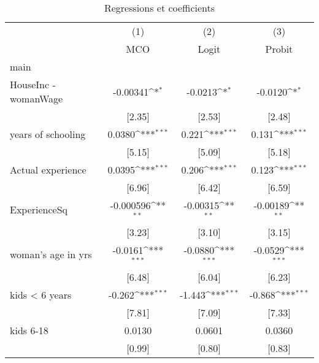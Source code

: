 \begin{table}[htbp]\centering
\def\sym#1{\ifmmode^{#1}\else\(^{#1}\)\fi}
\caption{Regressions et coefficients}
\begin{tabular}{l*{3}{c}}
\hline\hline
                    &\multicolumn{1}{c}{(1)}&\multicolumn{1}{c}{(2)}&\multicolumn{1}{c}{(3)}\\
                    &\multicolumn{1}{c}{MCO}&\multicolumn{1}{c}{Logit}&\multicolumn{1}{c}{Probit}\\
\hline
main                &                     &                     &                     \\
HouseInc -womanWage &    -0.00341\sym{*}  &     -0.0213\sym{*}  &     -0.0120\sym{*}  \\
                    &      [2.35]         &      [2.53]         &      [2.48]         \\

years of schooling  &      0.0380\sym{***}&       0.221\sym{***}&       0.131\sym{***}\\
                    &      [5.15]         &      [5.09]         &      [5.18]         \\

Actual experience   &      0.0395\sym{***}&       0.206\sym{***}&       0.123\sym{***}\\
                    &      [6.96]         &      [6.42]         &      [6.59]         \\

ExperienceSq        &   -0.000596\sym{**} &    -0.00315\sym{**} &    -0.00189\sym{**} \\
                    &      [3.23]         &      [3.10]         &      [3.15]         \\

woman's age in yrs  &     -0.0161\sym{***}&     -0.0880\sym{***}&     -0.0529\sym{***}\\
                    &      [6.48]         &      [6.04]         &      [6.23]         \\

kids < 6 years    &      -0.262\sym{***}&      -1.443\sym{***}&      -0.868\sym{***}\\
                    &      [7.81]         &      [7.09]         &      [7.33]         \\
 kids 6-18         &      0.0130         &      0.0601         &      0.0360         \\
                    &      [0.99]         &      [0.80]         &      [0.83]         \\


\end{tabular}
\end{table}
